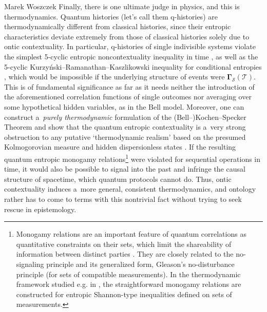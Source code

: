 \begin{artengenv}{Marek Woszczek}
Finally, there is one ultimate judge in physics, and this is thermodynamics. Quantum histories (let's call them q-histories) are thermodynamically different from classical histories, since their entropic characteristics deviate extremely from those of classical histories solely due to ontic contextuality. In particular, q-histories of single indivisible systems violate the simplest 5-cyclic entropic noncontextuality inequality in time
\parencite[][]{chaves_entropic_2012}, %
 as well as the 5-cyclic Kurzyński–Ramanathan–Kaszlikowski inequality for conditional entropies 
\parencite[][]{kurzynski_entropic_2012}, %
 which would be impossible if the underlying structure of events were $\bm{\Gamma}_{\mathcal{S}}(\mathcal{T})$. This is of fundamental significance as far as it needs neither the introduction of the aforementioned correlation functions of single outcomes nor averaging over some hypothetical hidden variables, as in the Bell model. Moreover, one can construct a~\textit{purely thermodynamic} formulation of the (Bell–)Kochen–Specker Theorem and show that the quantum entropic contextuality is a~very strong obstruction to any putative ‘thermodynamic realism' based on the presumed Kolmogorovian measure and hidden dispersionless states 
\parencite[][]{jia_entropic_2018}. %
 If the resulting quantum entropic monogamy relations\footnote{Monogamy relations are an important feature of quantum correlations as quantitative constraints on their sets, which limit the shareability of information between distinct parties 
\parencite[see e.g.][]{dhar_monogamy_2017}. %
 They are closely related to the no-signaling principle and its generalized form, Gleason's no-disturbance principle (for sets of compatible measurements). In the thermodynamic framework studied e.g. in 
\parencite[][]{jia_entropic_2018}, %
 the straightforward monogamy relations are constructed for entropic Shannon-type inequalities defined on sets of measurements.} were violated for sequential operations in time, it would also be possible to signal into the past and infringe the causal structure of spacetime, which quantum protocols cannot do. Thus, ontic contextuality induces a~more general, consistent thermodynamics, and ontology rather has to come to terms with this nontrivial fact without trying to seek rescue in epistemology.


\end{artengenv}
